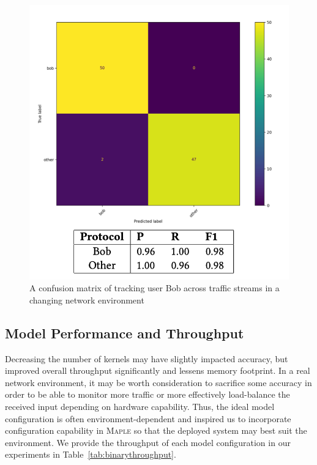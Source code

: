 \begin{figure} [ht!]
\centering
\includegraphics[scale=0.7]{chapters/5/img/userbob.png}
\caption{A confusion matrix of tracking user Bob across traffic streams in a changing network environment}
\label{fig:userbob}
\end{figure}

\subsection{Model Performance and Throughput}
Decreasing the number of kernels may have slightly impacted accuracy, but improved overall throughput significantly and lessens memory footprint. In a real network environment, it may be worth consideration to sacrifice some accuracy in order to be able to monitor more traffic or more effectively load-balance the received input depending on hardware capability. Thus, the ideal model configuration is often environment-dependent and inspired us to incorporate configuration capability in \textsc{Maple} so that the deployed system may best suit the environment. We provide the throughput of each model configuration in our experiments in Table~\ref{tab:binarythroughput}.
